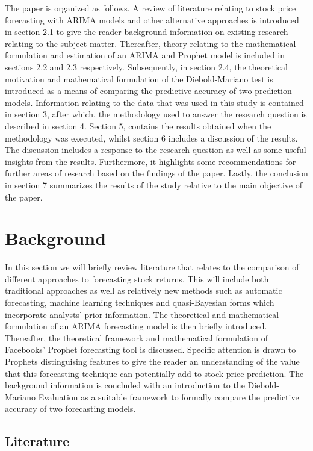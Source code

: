 \documentclass[12pt,a4paper]{article}
\numberwithin{equation}{section}
\numberwithin{figure}{section}
\numberwithin{table}{section}
\begin{document}
The paper is organized as follows. A review of literature relating to
stock price forecasting with ARIMA models and other alternative
approaches is introduced in section 2.1 to give the reader background
information on existing research relating to the subject matter.
Thereafter, theory relating to the mathematical formulation and
estimation of an ARIMA and Prophet model is included in sections 2.2 and
2.3 respectively. Subsequently, in section 2.4, the theoretical
motivation and mathematical formulation of the Diebold-Mariano test is
introduced as a means of comparing the predictive accuracy of two
prediction models. Information relating to the data that was used in
this study is contained in section 3, after which, the methodology used
to answer the research question is described in section 4. Section 5,
contains the results obtained when the methodology was executed, whilst
section 6 includes a discussion of the results. The discussion includes
a response to the research question as well as some useful insights from
the results. Furthermore, it highlights some recommendations for further
areas of research based on the findings of the paper. Lastly, the
conclusion in section 7 summarizes the results of the study relative to
the main objective of the paper.

\section{Background}\label{background}

In this section we will briefly review literature that relates to the
comparison of different approaches to forecasting stock returns. This
will include both traditional approaches as well as relatively new
methods such as automatic forecasting, machine learning techniques and
quasi-Bayesian forms which incorporate analysts' prior information. The
theoretical and mathematical formulation of an ARIMA forecasting model
is then briefly introduced. Thereafter, the theoretical framework and
mathematical formulation of Facebooks' Prophet forecasting tool is
discussed. Specific attention is drawn to Prophets distinguising
features to give the reader an understanding of the value that this
forecasting technique can potentially add to stock price prediction. The
background information is concluded with an introduction to the
Diebold-Mariano Evaluation as a suitable framework to formally compare
the predictive accuracy of two forecasting models.

\subsection{Literature}\label{literature}
\end{document}
